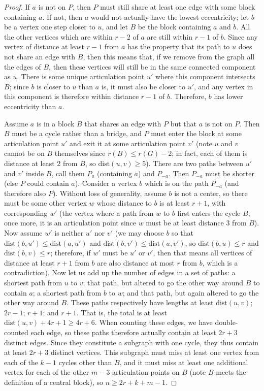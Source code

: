 \documentclass{amsart}
\theoremstyle{definition}
\newcommand{\dist}{\text{dist}}
\begin{document}
\begin{proof}
If $a$ is not on $P$, then $P$ must still share at least one edge with some block containing $a$. If not, then $a$ would not actually have the lowest eccentricity; let $b$ be a vertex one step closer to $u$, and let $B$ be the block containing $a$ and $b$. All the other vertices which are within $r-2$ of $a$ are still within $r-1$ of $b$. Since any vertex of distance at least $r-1$ from $a$ has the property that its path to $u$ does not share an edge with $B$, then this means that, if we remove from the graph all the edges of $B$, then these vertices will still be in the same connected component as $u$. There is some unique articulation point $u'$ where this component intersects $B$; since $b$ is closer to $u$ than $a$ is, it must also be closer to $u'$, and any vertex in this component is therefore within distance $r-1$ of $b$. Therefore, $b$ has lower eccentricity than $a$.

Assume $a$ is in a block $B$ that shares an edge with $P$ but that $a$ is not on $P$. Then $B$ must be a cycle rather than a bridge, and $P$ must enter the block at some articulation point $u'$ and exit it at some articulation point $v'$ (note $u$ and $v$ cannot be on $B$ themselves since $r(B) \leq r(G) - 2$; in fact, each of them is distance at least 2 from $B$, so $\dist(u,v) \geq 5$). There are two paths between $u'$ and $v'$ inside $B$, call them $P_a$ (containing $a$) and $P_{-a}$. Then $P_{-a}$ must be shorter (else $P$ could contain $a$). Consider a vertex $b$ which is on the path $P_{-a}$ (and therefore also $P$). Without loss of generality, assume $b$ is not a center, so there must be some other vertex $w$ whose distance to $b$ is at least $r+1$, with corresponding $w'$ (the vertex where a path from $w$ to $b$ first enters the cycle $B$; once more, it is an articulation point since $w$ must be at least distance 3 from $B$). Now assume $w'$ is neither $u'$ nor $v'$ (we may choose $b$ so that $\dist(b,u') \leq \dist(a,u')$ and $\dist(b,v') \leq \dist(a,v')$, so $\dist(b,u) \leq r$ and $\dist(b,v) \leq r$; therefore, if $w'$ must be $u'$ or $v'$, then that means all vertices of distance at least $r+1$ from $b$ are also distance at most $r$ from $b$, which is a contradiction). Now let us add up the number of edges in a set of paths: a shortest path from $u$ to $v$; that path, but altered to go the other way around $B$ to contain $a$; a shortest path from $b$ to $w$; and that path, but again altered to go the other way around $B$. These paths respectively have lengths at least $\dist(u,v)$; $2r-1$; $r+1$; and $r+1$. That is, the total is at least $\dist(u,v) + 4r + 1 \geq 4r+6$. When counting these edges, we have double-counted each edge, so these paths therefore actually contain at least $2r+3$ distinct edges. Since they constitute a subgraph with one cycle, they thus contain at least $2r+3$ distinct vertices. This subgraph must miss at least one vertex from each of the $k-1$ cycles other than $B$, and it must miss at least one additional vertex for each of the other $m-3$ articulation points on $B$ (note $B$ meets the definition of a central block), so $n \geq 2r + k + m - 1$.
\end{proof}
\end{document}
